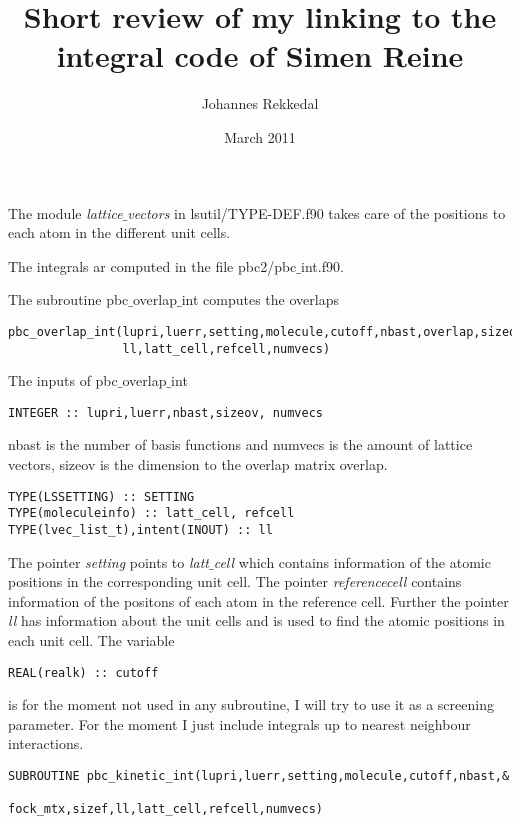\documentclass[12pt,a4paper,english]{article}
\begin{document}

\title{ Short review of my linking to the integral code of Simen Reine}
  \author{Johannes Rekkedal} 
\date{March 2011}
\maketitle

The module \emph{lattice$\_$vectors} in lsutil/TYPE-DEF.f90 takes care of the positions to each atom in the different unit cells. 

The integrals ar computed in the file pbc2/pbc$\_$int.f90. 

The subroutine pbc$\_$overlap$\_$int computes the overlaps

\begin{verbatim}
pbc_overlap_int(lupri,luerr,setting,molecule,cutoff,nbast,overlap,sizeov,&
                ll,latt_cell,refcell,numvecs)
\end{verbatim}
The inputs of pbc$\_$overlap$\_$int 
\begin{verbatim}
INTEGER :: lupri,luerr,nbast,sizeov, numvecs
\end{verbatim}
nbast is the number of basis functions and numvecs is the amount of lattice vectors, sizeov is the dimension to the overlap matrix overlap.
\begin{verbatim}
TYPE(LSSETTING) :: SETTING
TYPE(moleculeinfo) :: latt_cell, refcell
TYPE(lvec_list_t),intent(INOUT) :: ll
\end{verbatim}
The pointer \emph{setting} points to \emph{latt$\_$cell} which contains information of the atomic positions in the corresponding unit cell. 
The pointer \emph{referencecell} contains information of the positons of each atom in the reference cell.
Further the pointer \emph{ll} has information about the unit cells and is used to find the atomic positions in each unit cell.
The variable
\begin{verbatim}
REAL(realk) :: cutoff 
\end{verbatim}
is for the moment not used in any subroutine, I will try to use it as a screening parameter. For the moment I just include integrals up to nearest neighbour interactions.

\begin{verbatim}
SUBROUTINE pbc_kinetic_int(lupri,luerr,setting,molecule,cutoff,nbast,& 
                           fock_mtx,sizef,ll,latt_cell,refcell,numvecs)
\end{verbatim}
\end{document}
